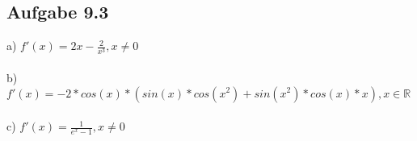 \documentclass{standalone}
\begin{document}
\subsection{Aufgabe 9.3}

a) $f'(x)=2x-\frac{2}{x^3}, x\neq 0$\\ \\
b) $f'(x)=-2*cos(x)*(sin(x)*cos(x^2)+sin(x^2)*cos(x)*x), x\in \mathbb{R}$\\ \\
c) $f'(x)=\frac{1}{e^x-1}, x \neq 0$
\end{document}

